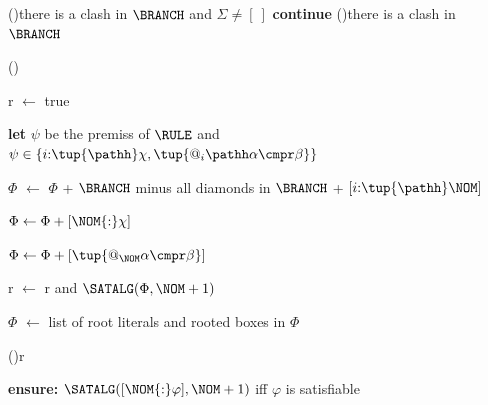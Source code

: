 \documentclass[10pt,a4paper]{amsart}
\theoremstyle{definition}
\theoremstyle{remark}
\begin{document}
\begin{algorithm}[t]
\begin{small}
{{                \vspace*{2pt}

                \If(){there is a clash in $\BRANCH$ and $\Sigma \neq [~]$}
                    {{\bf continue}\;}
                \ElseIf(){there is a clash in $\BRANCH$}
                    {\;}

                \vspace*{2pt}

                \RecStep()
                {
                    r $\gets$ true\;
                    {
                        {\bf let} $\psi$ be the premiss of $\RULE$ and $\psi \in \{i{:}\tup{\pathh}\chi, \tup{@_i\pathh\alpha \cmpr \beta}\}$\;

                        $\Phi$ $\gets$ $\Phi$ + $\BRANCH$ minus all diamonds in $\BRANCH$ + $[i{:}\tup{\pathh}\NOM]$\;

                            {$\Phi \gets \Phi + [\NOM{:}\chi]$}

                            {$\Phi \gets \Phi + [\tup{@_{\NOM}\alpha \cmpr \beta}]$}

                        {r $\gets$ r and $\SATALG(\Phi, \NOM+1)$}\;

                        $\Phi$ $\gets$ list of root literals and rooted boxes in $\Phi$\;
                    }
                }

                \vspace*{2pt}

                \lIf(){r}{}
            }
            \;
            {\bf ensure:} $\SATALG([\NOM{:}\varphi],\NOM+1)$ iff $\varphi$ is satisfiable
        }
    \end{small}
\end{algorithm}
\end{document}
